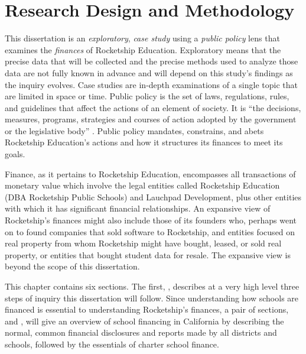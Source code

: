 
\chapter{Research Design and Methodology}\label{ch:methods}\indent%

This dissertation is an \textit{exploratory}, \textit{case study} using a \textit{public policy} lens that examines the \textit{finances} of Rocketship Education. Exploratory means that the precise data that will be collected and the precise methods used to analyze those data are not fully known in advance and will depend on this study's findings as the inquiry evolves. Case studies are in-depth examinations of a single topic that are limited in space or time. Public policy is the set of laws, regulations, rules, and guidelines that affect the actions of an element of society. It is ``the decisions, measures, programs, strategies and courses of action adopted by the government or the legislative body'' \parencite[3]{Knill.Tosun2020}. Public policy mandates, constrains, and abets Rocketship Education's actions and how it structures its finances to meet its goals.

Finance, as it pertains to Rocketship Education, encompasses all transactions of monetary value which involve the legal entities called Rocketship Education (DBA Rocketship Public Schools) and Lauchpad Development, plus other entities with which it has significant financial relationships. An expansive view of Rocketship's finances might also include those of its founders who, perhaps went on to found companies that sold software to Rocketship, and entities focused on real property from whom Rocketship might have bought, leased, or sold real property, or entities that bought student data for resale. The expansive view is beyond the scope of this dissertation.

This chapter contains six sections. The first, , describes at a very high level three steps of inquiry this dissertation will follow. Since understanding how schools are financed is essential to understanding Rocketship's finances, a pair of sections,  and , will give an overview of school financing in California by describing the normal, common financial disclosures and reports made by all districts and schools, followed by the essentials of charter school finance. 

